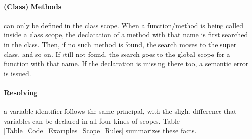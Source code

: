 \documentclass{article}
\begin{document}
\paragraph{(Class) Methods} can only be defined in the class scope.
When a function/method is being called inside a class scope, the declaration
of a method with that name is first searched in the class.
Then, if no such method is found, the search moves to the super class, and so on.
If still not found, the search goes to the global scope for a function with that name.
If the declaration is missing there too, a semantic error is issued.
\paragraph{Resolving} a variable identifier
follows the same principal, with the slight difference that variables can be declared
in all four kinds of scopes.
Table \ref{Table_Code_Examples_Scope_Rules} summarizes these facts.
\end{document}
